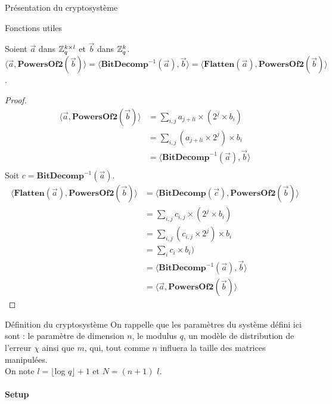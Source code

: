 \begin{section}{Présentation du cryptosystème}
\begin{subsection}{Fonctions utiles}
	\begin{prop}
	Soient $\vec{a}$ dans $\mathbb{Z}_q^{k \times l}$ et $\vec{b}$ dans $\mathbb{Z}_q^{k}$.
	$\langle \vec{a}, \textbf{PowersOf2}(\vec{b}) \rangle = \langle \textbf{BitDecomp}^{-1}(\vec{a}), \vec{b}\rangle = \langle \textbf{Flatten}(\vec{a}),\textbf{PowersOf2}(\vec{b}) \rangle$. \\
	\end{prop}
	\begin{proof}
	\begin{align*}
	\langle \vec{a}, \textbf{PowersOf2}(\vec{b}) \rangle &= \sum\limits_{i,j} a_{j+li} \times (2^{j} \times b_i) \\
	&= \sum\limits_{i,j} (a_{j+li} \times 2^{j}) \times b_i \\
	&= \langle \textbf{BitDecomp}^{-1}(\vec{a}), \vec{b}\rangle \\
	\end{align*}
	Soit $c = \textbf{BitDecomp}^{-1}(\vec{a})$.
	\begin{align*}
	\langle \textbf{Flatten}(\vec{a}),\textbf{PowersOf2}(\vec{b}) \rangle &= \langle \textbf{BitDecomp}(\vec{c}),\textbf{PowersOf2}(\vec{b}) \rangle \\
	&= \sum\limits_{i,j} c_{i,j} \times (2^{j} \times b_i) \\
	&= \sum\limits_{i,j} (c_{i,j} \times 2^{j}) \times b_i \\
	&= \sum\limits_{i} c_{i} \times b_i) \\
	&= \langle \textbf{BitDecomp}^{-1}(\vec{a}), \vec{b}\rangle \\
	&= \langle \vec{a}, \textbf{PowersOf2}(\vec{b}) \rangle
	\end{align*}
	\end{proof}
	
	\end{subsection}
	\begin{subsection}{Définition du cryptosystème}
	On rappelle que les paramètres du système défini ici sont : le paramètre de dimension $n$, le modulus $q$, un modèle de distribution de l'erreur $\chi$ ainsi que $m$, qui, tout comme $n$ influera la taille des matrices manipulées. \\
	On note $l = \lfloor$log $q\rfloor + 1$ et $N = (n + 1)$ $l$.
		
	\paragraph{}
	\textbf{Setup}
	\flushleft


\end{subsection}
\end{section}

